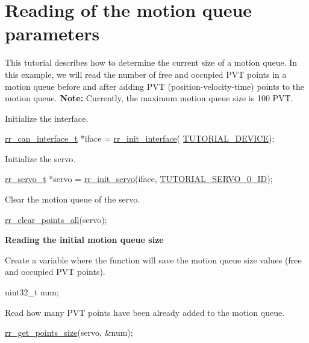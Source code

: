 \hypertarget{group__tutor__c__read__motion__queue}{}\section{Reading of the motion queue parameters}
\label{group__tutor__c__read__motion__queue}
This tutorial describes how to determine the current size of a motion queue. In this example, we will read the number of free and occupied P\+VT points in a motion queue before and after adding P\+VT (position-\/velocity-\/time) points to the motion queue. {\bfseries  Note\+:} Currently, the maximum motion queue size is 100 P\+VT.


\begin{DoxyEnumerate}
\item Initialize the interface. 
\begin{DoxyCodeInclude}
    \hyperlink{structrr__can__interface__t}{rr\_can\_interface\_t} *iface = \hyperlink{group___init_ga472a4890dcc7d7a13123c56a06946d91}{rr\_init\_interface}(
      \hyperlink{tutorial_8h_a90947332a0345dc693905e3fc04dbeb2}{TUTORIAL\_DEVICE});
\end{DoxyCodeInclude}

\item Initialize the servo. 
\begin{DoxyCodeInclude}
    \hyperlink{structrr__servo__t}{rr\_servo\_t} *servo = \hyperlink{group___init_ga0adb313a3eeb8a4399431e940a1f3e9e}{rr\_init\_servo}(iface, 
      \hyperlink{tutorial_8h_a9a3d33f25d3a72a8e30c885d238b3b65}{TUTORIAL\_SERVO\_0\_ID});
\end{DoxyCodeInclude}

\item Clear the motion queue of the servo. 
\begin{DoxyCodeInclude}
    \hyperlink{group___trajectory_ga19472cd90ae91f9b9f49edf4f52f35a2}{rr\_clear\_points\_all}(servo);
\end{DoxyCodeInclude}
 {\bfseries  Reading the initial motion queue size}
\item Create a variable where the function will save the motion queue size values (free and occupied P\+VT points). 
\begin{DoxyCodeInclude}
    uint32\_t num;
\end{DoxyCodeInclude}

\item Read how many P\+VT points have been already added to the motion queue. 
\begin{DoxyCodeInclude}
    \hyperlink{group___trajectory_gae6ed290842e08d349dd86bb1264e6a17}{rr\_get\_points\_size}(servo, &num);
\end{DoxyCodeInclude}


\end{DoxyEnumerate}
